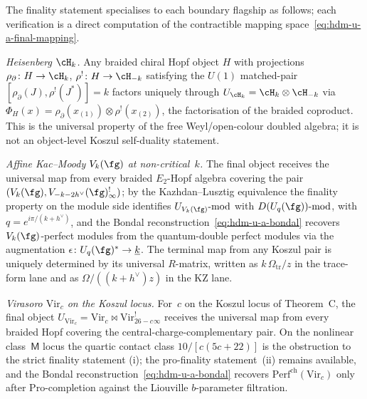 \begin{example}
\label{ex:hdm-u-a-final-flagships}
The finality statement specialises to each boundary flagship as
follows; each verification is a direct computation of the contractible
mapping space~\eqref{eq:hdm-u-a-final-mapping}.

\emph{Heisenberg $\cH_k$.} Any braided chiral Hopf object $H$ with
projections $\rho_\partial\colon H\to\cH_k$,
$\rho^!\colon H\to\cH_{-k}$ satisfying the $U(1)$ matched-pair
$[\rho_\partial(J),\rho^!(J^*)]=k$ factors uniquely through
$U_{\cH_k}=\cH_k\otimes\cH_{-k}$ via
$\Phi_H(x)=\rho_\partial(x_{(1)})\otimes\rho^!(x_{(2)})$, the factorisation
of the braided coproduct. This is the universal property of the free
Weyl/open-colour doubled algebra; it is not an object-level Koszul
self-duality statement.

\emph{Affine Kac--Moody $V_k(\fg)$ at non-critical~$k$.} The final
object receives the universal map from every braided $E_2$-Hopf
algebra covering the pair $(V_k(\fg),V_{-k-2h^\vee}(\fg)^!_\infty)$;
by the Kazhdan--Lusztig equivalence the finality property on the
module side identifies $U_{V_k(\fg)}\text{-}\mathrm{mod}$ with
$D(U_q(\fg))\text{-}\mathrm{mod}$, with $q=e^{i\pi/(k+h^\vee)}$, and
the Bondal reconstruction~\eqref{eq:hdm-u-a-bondal} recovers
$V_k(\fg)$-perfect modules from the quantum-double perfect modules
via the augmentation $\epsilon\colon U_q(\fg)^*\to \underline k$. The
terminal map from any Koszul pair is uniquely determined by its
universal $R$-matrix, written as $k\,\Omega_{\mathrm{tr}}/z$ in the
trace-form lane and as $\Omega/((k+h^\vee)z)$ in the KZ lane.

\emph{Virasoro $\mathrm{Vir}_c$ on the Koszul locus.} For~$c$ on the
Koszul locus of Theorem~C, the final object
$U_{\mathrm{Vir}_c}=\mathrm{Vir}_c\bowtie\mathrm{Vir}_{26-c}^!_\infty$
receives the universal map from every braided Hopf covering the
central-charge-complementary pair. On the nonlinear class~$\mathsf M$
locus the quartic contact class $10/[c(5c+22)]$ is the obstruction to
the strict finality statement \textup{(i)}; the pro-finality
statement~\textup{(ii)} remains available, and the Bondal
reconstruction~\eqref{eq:hdm-u-a-bondal} recovers
$\mathrm{Perf}^{\mathrm{ch}}(\mathrm{Vir}_c)$ only after
$\mathrm{Pro}$-completion against the Liouville $b$-parameter
filtration.
\end{example}

